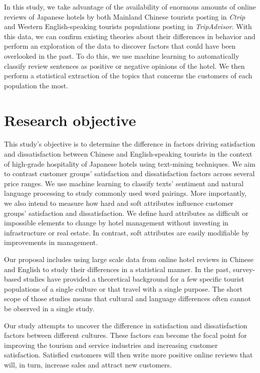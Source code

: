 \documentclass[smallextended,natbib]{svjour3}       %
\begin{document}
  In this study, we take advantage of the availability of enormous amounts of online reviews of Japanese hotels by both Mainland Chinese tourists posting in \textit{Ctrip} and Western English-speaking tourists populations posting in \textit{TripAdvisor}. With this data, we can confirm existing theories about their differences in behavior and perform an exploration of the data to discover factors that could have been overlooked in the past. To do this, we use machine learning to automatically classify review sentences as positive or negative opinions of the hotel. We then perform a statistical extraction of the topics that concerns the customers of each population the most.

\section{Research objective}\label{research_objective}

  This study's objective is to determine the difference in factors driving satisfaction and dissatisfaction between Chinese and English-speaking tourists in the context of high-grade hospitality of Japanese hotels using text-mining techniques. We aim to contrast customer groups' satisfaction and dissatisfaction factors across several price ranges. We use machine learning to classify texts' sentiment and natural language processing to study commonly used word pairings. More importantly, we also intend to measure how hard and soft attributes influence customer groups' satisfaction and dissatisfaction. We define hard attributes as difficult or impossible elements to change by hotel management without investing in infrastructure or real estate. In contrast, soft attributes are easily modifiable by improvements in management.

  Our proposal includes using large scale data from online hotel reviews in Chinese and English to study their differences in a statistical manner. In the past, survey-based studies have provided a theoretical background for a few specific tourist populations of a single culture or that travel with a single purpose. The short scope of those studies means that cultural and language differences often cannot be observed in a single study.

  Our study attempts to uncover the difference in satisfaction and dissatisfaction factors between different cultures. These factors can become the focal point for improving the tourism and service industries and increasing customer satisfaction. Satisfied customers will then write more positive online reviews that will, in turn, increase sales and attract new customers. 
\end{document}
